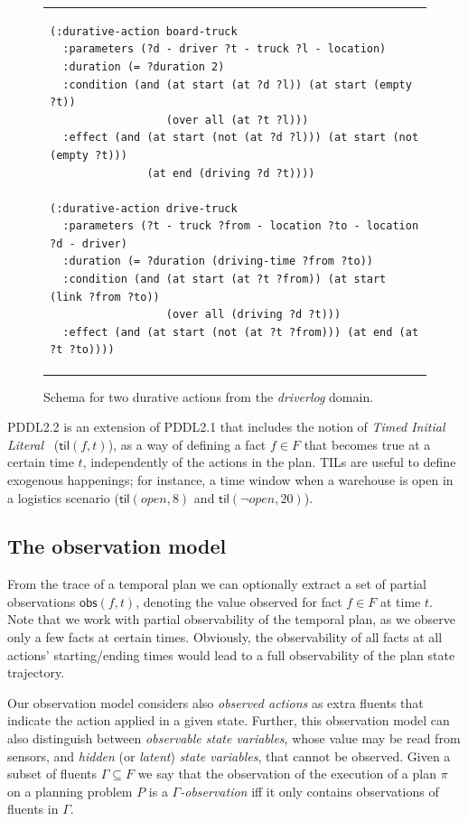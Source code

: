 \documentclass[runningheads]{llncs}
\newcommand{\obs}{\mathsf{obs}}    %
\newcommand{\til}{\mathsf{til}}    %
\begin{document}
\begin{figure}
\begin{tabular}{p{\textwidth}}
\begin{verbatim}
(:durative-action board-truck
  :parameters (?d - driver ?t - truck ?l - location)
  :duration (= ?duration 2)
  :condition (and (at start (at ?d ?l)) (at start (empty ?t))
                  (over all (at ?t ?l)))
  :effect (and (at start (not (at ?d ?l))) (at start (not (empty ?t)))
               (at end (driving ?d ?t))))

(:durative-action drive-truck
  :parameters (?t - truck ?from - location ?to - location ?d - driver)
  :duration (= ?duration (driving-time ?from ?to))
  :condition (and (at start (at ?t ?from)) (at start (link ?from ?to))
                  (over all (driving ?d ?t)))
  :effect (and (at start (not (at ?t ?from))) (at end (at ?t ?to))))
\end{verbatim}
\end{tabular}
\label{fig:exampleactions2}
\caption{\small Schema for two durative actions from the {\em driverlog} domain.}
\end{figure}

PDDL2.2 is an extension of PDDL2.1 that includes the notion of {\em Timed Initial Literal}~\cite{hoffmann2005} ($\til(f,t)$), as a way of defining a fact $f\in F$ that becomes true at a certain time $t$, independently of the actions in the plan. TILs are useful to define exogenous happenings; for instance, a time window when a warehouse is open in a logistics scenario ($\til(open,8)$ and $\til(\neg open,20)$).

 
\subsection{The observation model}
\label{sec:omodel}
From the trace of a temporal plan we can optionally extract a set of partial observations $\obs(f,t)$, denoting the value observed for fact $f \in F$ at time $t$. Note that we work with partial observability of the temporal plan, as we observe only a few facts at certain times. Obviously, the observability of all facts at all actions' starting/ending times would lead to a full observability of the plan state trajectory.

Our observation model considers also {\em observed actions} as extra fluents that indicate the action applied in a given state. Further, this observation model can also distinguish between {\em observable state variables}, whose value may be read from sensors, and {\em hidden} (or {\em latent}) {\em state variables}, that cannot be observed. Given a subset of fluents $\Gamma\subseteq F$ we say that the observation of the execution of a plan $\pi$ on a planning problem $P$ is a {\em $\Gamma$-observation} iff it only contains observations of fluents in $\Gamma$.
\end{document}
